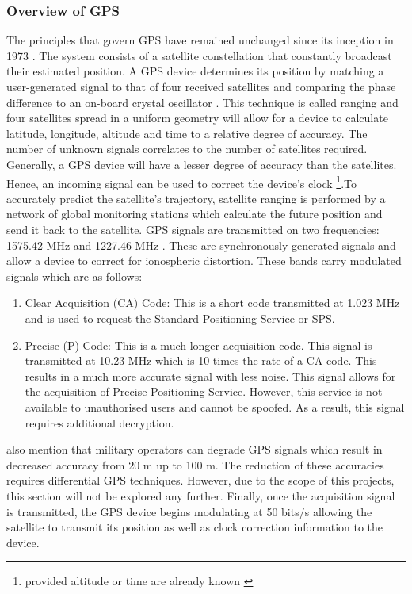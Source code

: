 \subsubsection{Overview of GPS}

The principles that govern GPS have remained unchanged since its inception in 1973 \cite{spilker1996global}. The system consists of a satellite constellation that constantly broadcast their estimated position. A GPS device determines its position by matching a user-generated signal to that of four received satellites and comparing the phase difference to an on-board crystal oscillator \cite{spilker1996global}. This technique is called ranging and four satellites spread in a uniform geometry will allow for a device to calculate latitude, longitude, altitude and time to a relative degree of accuracy. The number of unknown signals correlates to the number of satellites required. Generally, a GPS device will have a lesser degree of accuracy than the satellites. Hence, an incoming signal can be used to correct the device's clock \footnote{provided altitude or time are already known \cite{spilker1996global}}.To accurately predict the satellite's trajectory, satellite ranging is performed by a network of global monitoring stations which calculate the future position and send it back to the satellite. GPS signals are transmitted on two frequencies: 1575.42 MHz and 1227.46 MHz \cite{spilker1996global}. These are synchronously generated signals and allow a device to correct for ionospheric distortion. These bands carry modulated signals which are as follows: \cite{spilker1996global}


\begin{enumerate}
	\item Clear Acquisition (CA) Code:  This is a short code transmitted at 1.023 MHz and is used to request the Standard Positioning Service or SPS.
	\item Precise (P) Code: This is a much longer acquisition code. This signal is transmitted at 10.23 MHz which is 10 times the rate of a CA code. This results in a much more accurate signal with less noise. This signal allows for the acquisition of Precise Positioning Service. However, this service is not available to unauthorised users and cannot be spoofed. As a result, this signal requires additional decryption.    
\end{enumerate}

\textcite{spilker1996global} also mention that military operators can degrade GPS signals which result in decreased accuracy from 20 m up to 100 m. The reduction of these accuracies requires differential GPS techniques. However, due to the scope of this projects, this section will not be explored any further. Finally, once the acquisition signal is transmitted, the GPS device begins modulating at 50 bits/s allowing the satellite to transmit its position as well as clock correction information to the device.\par

